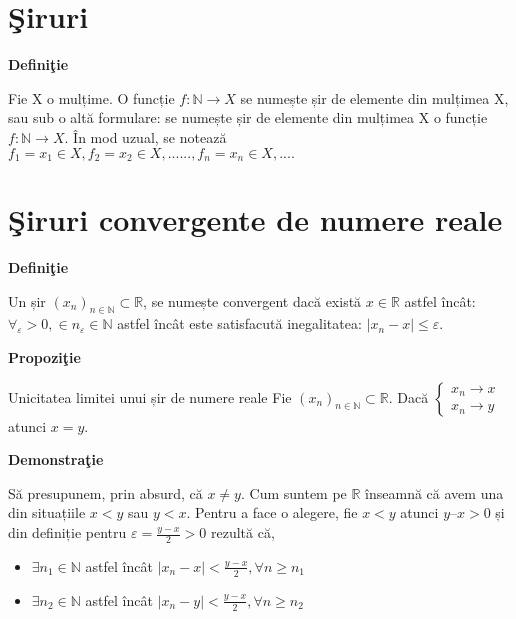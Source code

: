 \documentclass[a4paper,12pt,oneside]{report}
\begin{document}
\maketitle

\tableofcontents



\chapter{\c Siruri}

\textbf{Defini\c tie}

Fie X o mulțime. O funcție \(f:\mathbb{N} \to X\) se numește șir de elemente din mulțimea X, sau sub o altă formulare: se numește șir de elemente din mulțimea X o funcție \(f:\mathbb{N} \to X\). În mod uzual, se notează \(f_{1} = x_{1} \in X, f_{2} = x_{2} \in X,......, f_{n} = x_{n} \in X,....\)

\chapter{\c Siruri convergente de numere reale}


\textbf{Defini\c tie}

Un șir \((x_{n})_{n \in \mathbb{N}} \subset \mathbb{R} \), se numește convergent dacă există \(x \in \mathbb{R}\) astfel încât:
\(\forall _{\varepsilon } > 0, \in n_{\varepsilon } \in \mathbb{N} \) astfel încât este satisfacută inegalitatea: \(\left | x_{n}- x \right | \leq \varepsilon \).

\textbf{Propozi\c tie}

Unicitatea limitei unui șir de numere reale
Fie \((x_{n})_{n \in \mathbb{N}} \subset \mathbb{R}\). 
Dacă \(\left\{\begin{matrix}
x_{n} \to  x\\ 
x_{n} \to y
\end{matrix}\right.
\) atunci \(x=y.\)

\textbf{Demonstra\c tie}

Să presupunem, prin absurd, că \(x \neq  y\). Cum suntem pe \(\mathbb{R}\) înseamnă că avem una din situațiile \(x < y\) sau \(y < x\). Pentru a face o alegere, fie \(x < y\) atunci \(y – x > 0\) și din definiție pentru \(\varepsilon = \frac{y- x}{2}  > 0\) rezultă că, 

\begin{itemize}
  \item \(\exists  n_{1} \in \mathbb{N}\) astfel încât \(\left | x_{n} - x  \right | < \frac{y - x }{2} , \forall n \geq n_{1} \)
  \item \(\exists  n_{2} \in \mathbb{N}\) astfel încât \(\left | x_{n} - y  \right | < \frac{y - x }{2} , \forall n \geq n_{2} \)
\end{itemize}
\end{document}
